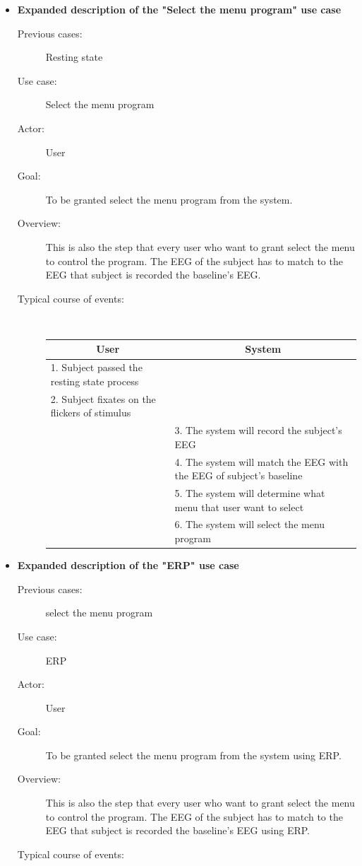 \begin{itemize}
\begin{description}
{\begin{tabular}{| m{.47\linewidth} | m{.47\linewidth} |}
		\end{tabular}
	}
	
\end{description}

\item \textbf{Expanded description of the "Select the menu program" use case }
\begin{description}
	\item [Previous cases:] Resting state
	\item [Use case:] Select the menu program
	\item [Actor:] User  
	\item [Goal:] To be granted select the menu program from the system. 
	\item [Overview:] This is also the step that every user who want to grant select the menu to control the program. The EEG of the subject has to match to the EEG that subject is recorded the baseline’s EEG.
	\item [Typical course of events:]~
	
	{
		\centering
		\begin{tabular}{| m{.47\linewidth} | m{.47\linewidth} |}
			
			\hline 
			\multicolumn{1}{|c}{\textbf{User}} & 
  			\multicolumn{1}{|c|}{\textbf{System}}\\
			\hline 
			1. Subject passed the resting state process &   \\
			\hline 
			2. Subject fixates on the flickers of stimulus   &   \\
			\hline 
			& 3. The system will record the subject’s EEG \\
			\hline 
			& 4. The system will match the EEG with the EEG of subject’s baseline  \\
			\hline
			& 5. The system will determine what menu that user want to select \\
			\hline
			& 6. The system will select the menu program\\
			\hline
			
		\end{tabular}
	}
	
\end{description}

\item \textbf{Expanded description of the "ERP" use case }
\begin{description}
	\item [Previous cases:] select the menu program
	\item [Use case:] ERP
	\item [Actor:] User  
	\item [Goal:] To be granted select the menu program from the system using ERP. 
	\item [Overview:] This is also the step that every user who want to grant select the menu to control the program. The EEG of the subject has to match to the EEG that subject is recorded the baseline’s EEG using ERP. 
	\item [Typical course of events:]~
	

\end{description}
\end{itemize}

